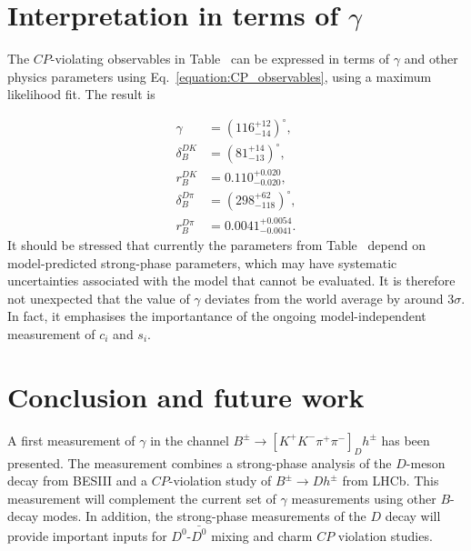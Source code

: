\documentclass[12pt, a4paper, notitlepage, onecolumn]{article}
\begin{document}
\section{Interpretation in terms of \texorpdfstring{$\gamma$}{gamma}}
\noindent The $C\!P$-violating observables in Table~\cite{table:GGSZ_observables} can be expressed in terms of $\gamma$ and other physics parameters using Eq.~\eqref{equation:CP_observables}, using a maximum likelihood fit. The result is

\begin{align*}
    \gamma &= (116^{+12}_{-14})^\circ, \\
    \delta_B^{DK} &= (81^{+14}_{-13})^\circ, \\
    r_B^{DK} &= 0.110^{+0.020}_{-0.020}, \\
    \delta_B^{D\pi} &= (298^{+62}_{-118})^\circ, \\
    r_B^{D\pi} &= 0.0041^{+0.0054}_{-0.0041}.
\end{align*}
It should be stressed that currently the parameters from Table~\cite{table:GGSZ_observables} depend on model-predicted strong-phase parameters, which may have systematic uncertainties associated with the model that cannot be evaluated. It is therefore not unexpected that the value of $\gamma$ deviates from the world average by around $3\sigma$. In fact, it emphasises the importantance of the ongoing model-independent measurement of $c_i$ and $s_i$.

\section{Conclusion and future work}
\noindent A first measurement of $\gamma$ in the channel $B^\pm\to[K^+K^-\pi^+\pi^-]_Dh^\pm$ has been presented. The measurement combines a strong-phase analysis of the $D$-meson decay from BESIII and a $C\!P$-violation study of $B^\pm\to Dh^\pm$ from LHCb. This measurement will complement the current set of $\gamma$ measurements using other $B$-decay modes. In addition, the strong-phase measurements of the $D$ decay will provide important inputs for $D^0$-$\bar{D^0}$ mixing and charm $C\!P$ violation studies.



\end{document}
